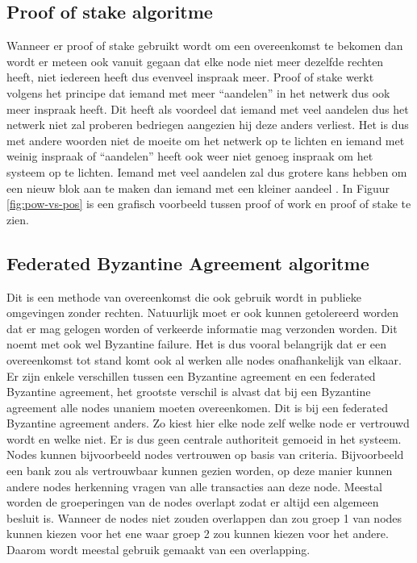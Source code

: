 \subsection{Proof of stake algoritme}
Wanneer er proof of stake gebruikt wordt om een overeenkomst te bekomen dan wordt er meteen ook vanuit gegaan dat elke node niet meer dezelfde rechten heeft, niet iedereen heeft dus evenveel inspraak meer. Proof of stake werkt volgens het principe dat iemand met meer ``aandelen'' in het netwerk dus ook meer inspraak heeft. Dit heeft als voordeel dat iemand met veel aandelen dus het netwerk niet zal proberen bedriegen aangezien hij deze anders verliest. Het is dus met andere woorden niet de moeite om het netwerk op te lichten en iemand met weinig inspraak of ``aandelen'' heeft ook weer niet genoeg inspraak om het systeem op te lichten. Iemand met veel aandelen zal dus grotere kans hebben om een nieuw blok aan te maken dan iemand met een kleiner aandeel \textcite{Buterin2013}. In Figuur \ref{fig:pow-vs-pos} is een grafisch voorbeeld tussen proof of work en proof of stake te zien.

\subsection{Federated Byzantine Agreement algoritme}
Dit is een methode van overeenkomst die ook gebruik wordt in publieke omgevingen zonder rechten. Natuurlijk moet er ook kunnen getolereerd worden dat er mag gelogen worden of verkeerde informatie mag verzonden worden. Dit noemt met ook wel Byzantine failure. Het is dus vooral belangrijk dat er een overeenkomst tot stand komt ook al werken alle nodes onafhankelijk van elkaar. Er zijn enkele verschillen tussen een Byzantine agreement en een federated Byzantine agreement, het grootste verschil is alvast dat bij een Byzantine agreement alle nodes unaniem moeten overeenkomen. Dit is bij een federated Byzantine agreement anders. Zo kiest hier elke node zelf welke node er vertrouwd wordt en welke niet. Er is dus geen centrale authoriteit gemoeid in het systeem. Nodes kunnen bijvoorbeeld nodes vertrouwen op basis van criteria. Bijvoorbeeld een bank zou als vertrouwbaar kunnen gezien worden, op deze manier kunnen andere nodes herkenning vragen van alle transacties aan deze node. Meestal worden de groeperingen van de nodes overlapt zodat er altijd een algemeen besluit is. Wanneer de nodes niet zouden overlappen dan zou groep 1 van nodes kunnen kiezen voor het ene waar groep 2 zou kunnen kiezen voor het andere. Daarom wordt meestal gebruik gemaakt van een overlapping.

